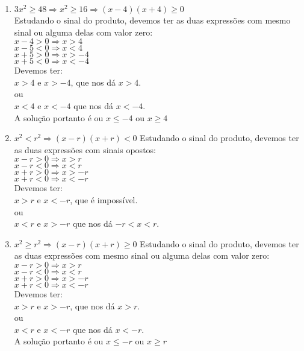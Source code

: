 \documentclass[10pt]{book}
\begin{document}
\begin{enumerate}
\begin{enumerate}
			\item %
			$3x^2 \geq 48 \Rightarrow x^2 \geq 16 \Rightarrow (x - 4)(x + 4) \geq 0$\\
			Estudando o sinal do produto, devemos ter as duas expressões com mesmo sinal ou alguma delas com valor zero:\\
			$x-4 > 0 \Rightarrow x > 4$\\
			$x-5 < 0 \Rightarrow x < 4$\\
			$x+5 > 0 \Rightarrow x > -4$\\
			$x+5 < 0 \Rightarrow x < -4$\\
			Devemos ter:\\
			$x > 4$ e $x > -4$, que nos dá $x > 4$.\\
			ou\\
			$x < 4$ e $x < -4$ que nos dá $x < -4$.\\
			A solução portanto é ou $x \leq -4$ ou $x \geq 4$
			\item %
			$x^2 < r^2 \Rightarrow (x-r)(x+r) < 0$
			Estudando o sinal do produto, devemos ter as duas expressões com sinais opostos:\\
			$x-r > 0 \Rightarrow x > r$\\
			$x-r < 0 \Rightarrow x < r$\\
			$x+r > 0 \Rightarrow x > -r$\\
			$x+r < 0 \Rightarrow x < -r$\\
			Devemos ter:\\
			$x > r$ e $x < -r$, que é impossível.\\
			ou\\
			$x < r$ e $x > -r$ que nos dá $-r < x < r$.
			\item %
			$x^2 \geq r^2 \Rightarrow (x-r)(x+r) \geq 0$
			Estudando o sinal do produto, devemos ter as duas expressões com mesmo sinal ou alguma delas com valor zero:\\
			$x-r > 0 \Rightarrow x > r$\\
			$x-r < 0 \Rightarrow x < r$\\
			$x+r > 0 \Rightarrow x > -r$\\
			$x+r < 0 \Rightarrow x < -r$\\
			Devemos ter:\\
			$x > r$ e $x > -r$, que nos dá $x > r$.\\
			ou\\
			$x < r$ e $x < -r$ que nos dá $x < -r$.\\
			A solução portanto é ou $x \leq -r$ ou $x \geq r$

\end{enumerate}
\end{enumerate}
\end{document}

